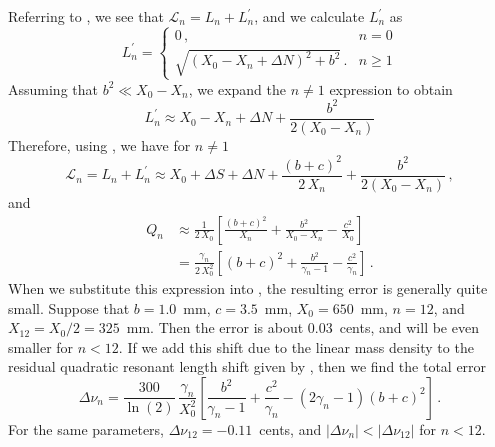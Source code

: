 Referring to , we see that $\mathcal{L}_n = L_n + L^\prime_n$, and we calculate $L^\prime_n$ as
 \begin{equation}
L^\prime_n = \begin{cases}
0\, , & n =  0 \\
\sqrt{\left(X_0 - X_n + \Delta N\right)^2 + b^2}\, . & n \ge 1
 \end{cases}
 \end{equation}
Assuming that $b^2 \ll X_0 - X_n$, we expand the $n \ne 1$ expression to obtain
 \begin{equation}
L^\prime_n \approx X_0 - X_n + \Delta N + \frac{b^2}{2 \left(X_0 - X_n\right)}
 \end{equation}
Therefore, using , we have for $n \ne 1$
 \begin{equation}
\mathcal{L}_n = L_n + L^\prime_n \approx X_0 + \Delta S + \Delta N + \frac{(b + c)^2}{2\, X_n} + \frac{b^2}{2 \left(X_0 - X_n\right)}\, ,
 \end{equation}
and
 \begin{equation} \label{eqn:lambda_n_approx}
 \begin{split}
Q_n &\approx \frac{1}{2\, X_0} \left[ \frac{(b + c)^2}{X_n} + \frac{b^2}{X_0 - X_n} - \frac{c^2}{X_0} \right] \\
&= \frac{\gamma_n}{2\, X_0^2} \left[ (b + c)^2 + \frac{b^2}{\gamma_{n} - 1} - \frac{c^2}{\gamma_n} \right] \, .
 \end{split}
 \end{equation}
When we substitute this expression into , the resulting error is generally quite small. Suppose that $b = 1.0$~mm, $c = 3.5$~mm, $X_0 = 650$~mm, $n = 12$, and $X_{12} = X_0 / 2 = 325$~mm. Then the error is about 0.03~cents, and will be even smaller for $n < 12$. If we add this shift due to the linear mass density to the residual quadratic resonant length shift given by , then we find the total error
 \begin{equation} \label{eqn:quad_shift}
\Delta \nu_n = \frac{300}{\ln(2)}\, \frac{\gamma_n}{X_0^2} \left[ \frac{b^2}{\gamma_n - 1} + \frac{c^2}{\gamma_n} - (2 \gamma_n - 1) (b + c)^2 \right]\, .
 \end{equation}
For the same parameters, $\Delta \nu_{12} = -0.11$~cents, and $|\Delta \nu_n| < |\Delta \nu_{12}|$ for $n < 12$.

